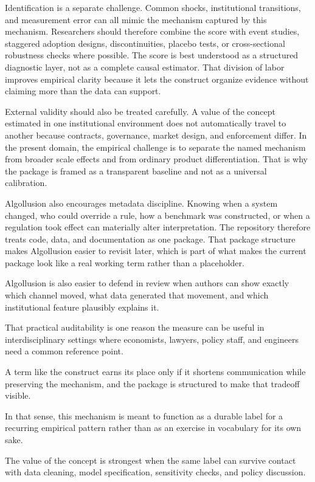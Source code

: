 \documentclass[12pt]{article}
\begin{document}
Identification is a separate challenge. Common shocks, institutional transitions, and measurement error can all mimic the mechanism captured by this mechanism. Researchers should therefore combine the score with event studies, staggered adoption designs, discontinuities, placebo tests, or cross-sectional robustness checks where possible. The score is best understood as a structured diagnostic layer, not as a complete causal estimator. That division of labor improves empirical clarity because it lets the construct organize evidence without claiming more than the data can support.

External validity should also be treated carefully. A value of the concept estimated in one institutional environment does not automatically travel to another because contracts, governance, market design, and enforcement differ. In the present domain, the empirical challenge is to separate the named mechanism from broader scale effects and from ordinary product differentiation. That is why the package is framed as a transparent baseline and not as a universal calibration.

Algollusion also encourages metadata discipline. Knowing when a system changed, who could override a rule, how a benchmark was constructed, or when a regulation took effect can materially alter interpretation. The repository therefore treats code, data, and documentation as one package. That package structure makes Algollusion easier to revisit later, which is part of what makes the current package look like a real working term rather than a placeholder.

Algollusion is also easier to defend in review when authors can show exactly which channel moved, what data generated that movement, and which institutional feature plausibly explains it.

That practical auditability is one reason the measure can be useful in interdisciplinary settings where economists, lawyers, policy staff, and engineers need a common reference point.

A term like the construct earns its place only if it shortens communication while preserving the mechanism, and the package is structured to make that tradeoff visible.

In that sense, this mechanism is meant to function as a durable label for a recurring empirical pattern rather than as an exercise in vocabulary for its own sake.

The value of the concept is strongest when the same label can survive contact with data cleaning, model specification, sensitivity checks, and policy discussion.
\end{document}
